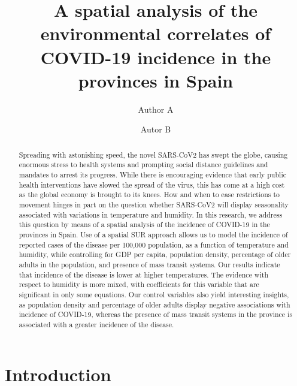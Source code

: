 \documentclass[]{elsarticle} %
\begin{document}
\begin{frontmatter}

  \title{A spatial analysis of the environmental correlates of COVID-19 incidence
in the provinces in Spain}
    \author[University]{Author A}
    \author[School]{Autor B}
      \address[University]{Department, Street, City, State, Zip}
    \address[School]{Department, Street, City, State, Zip}
  
  \begin{abstract}
  Spreading with astonishing speed, the novel SARS-CoV2 has swept the
  globe, causing enormous stress to health systems and prompting social
  distance guidelines and mandates to arrest its progress. While there is
  encouraging evidence that early public health interventions have slowed
  the spread of the virus, this has come at a high cost as the global
  economy is brought to its knees. How and when to ease restrictions to
  movement hinges in part on the question whether SARS-CoV2 will display
  seasonality associated with variations in temperature and humidity. In
  this research, we address this question by means of a spatial analysis
  of the incidence of COVID-19 in the provinces in Spain. Use of a spatial
  SUR approach allows us to model the incidence of reported cases of the
  disease per 100,000 population, as a function of temperature and
  humidity, while controlling for GDP per capita, population density,
  percentage of older adults in the population, and presence of mass
  transit systems. Our results indicate that incidence of the disease is
  lower at higher temperatures. The evidence with respect to humidity is
  more mixed, with coefficients for this variable that are significant in
  only some equations. Our control variables also yield interesting
  insights, as population density and percentage of older adults display
  negative associations with incidence of COVID-19, whereas the presence
  of mass transit systems in the province is associated with a greater
  incidence of the disease.\\
  \end{abstract}
  
 \end{frontmatter}

\hypertarget{introduction}{%
\section{Introduction}\label{introduction}}
\end{document}
